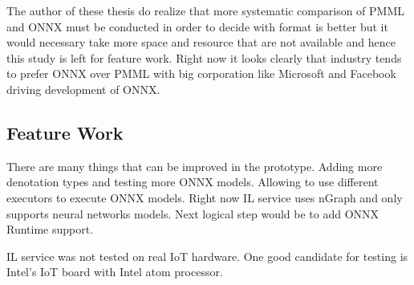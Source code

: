 \documentclass[english, 12pt, a4paper, elec, utf8, online]{aaltothesis}
\begin{document}
The author of these thesis do realize that more systematic comparison of PMML and ONNX must be conducted in order to decide with format is better but it would necessary take more space and resource that are not available and hence this study is left for feature work. Right now it looks clearly that industry tends to prefer ONNX over PMML with big corporation like Microsoft and Facebook driving development of ONNX.

\subsection{Feature Work}   
There are many things that can be improved in the prototype. Adding more denotation types and testing more ONNX models. Allowing to use different executors to execute  ONNX models. Right now IL service uses nGraph and only supports neural networks models. Next logical step would be to add ONNX Runtime support. 

IL service was not tested on real IoT hardware. One good candidate for testing is Intel's IoT board with Intel atom processor. 


\end{document}
